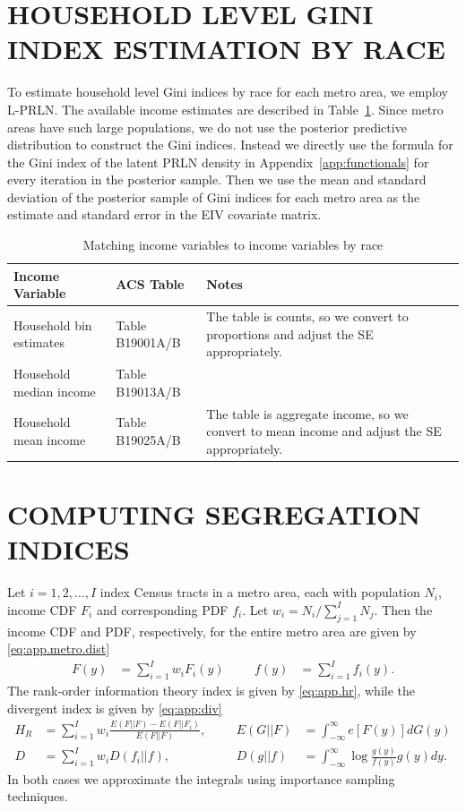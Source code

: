 \documentclass[12pt]{article}
\begin{document}
\section{HOUSEHOLD LEVEL GINI INDEX ESTIMATION BY RACE}\label{app:gini}
\setcounter{table}{0}
To estimate household level Gini indices by race for each metro area, we employ L-PRLN. The available income estimates are described in Table~\ref{tab:race.income.ests}. Since metro areas have such large populations, we do not use the posterior predictive distribution to construct the Gini indices. Instead we directly use the formula for the Gini index of the latent PRLN density in Appendix~\ref{app:functionals} for every iteration in the posterior sample. Then we use the mean and standard deviation of the posterior sample of Gini indices for each metro area as the estimate and standard error in the EIV covariate matrix.

\begin{table}[ht]
  \centering
  \scriptsize{
  \begin{tabular}{|m{9em}|m{4cm}|m{8cm}|}
    \hline
    Income Variable & ACS Table & Notes \\
    \hline
    Household bin estimates & Table B19001A/B & The table is counts, so we convert to proportions and adjust the SE appropriately.\\\hline
    Household median income & Table B19013A/B &  \\\hline
    Household mean income & Table B19025A/B & The table is aggregate income, so we convert to mean income and adjust the SE appropriately. \\\hline
  \end{tabular}
  }
  \caption{Matching income variables to income variables by race}
  \label{tab:race.income.ests}
\end{table}

\clearpage

\section{COMPUTING SEGREGATION INDICES}\label{app:compute.indices}
\setcounter{table}{0}
Let $i=1,2,\dots,I$ index Census tracts in a metro area, each with population $N_i$, income CDF $F_i$ and corresponding PDF $f_i$. Let $w_i = N_i / \sum_{j=1}^IN_j$. Then the income CDF and PDF, respectively, for the entire metro area are given by \eqref{eq:app.metro.dist}
\begin{align}
  F(y) &= \sum_{i=1}^Iw_iF_i(y) &&& f(y) &= \sum_{i=1}^If_i(y). \label{eq:app.metro.dist}
\end{align}
The rank-order information theory index is given by \eqref{eq:app.hr}, while the divergent index is given by \eqref{eq:app:div}
\begin{align}
  H_R &= \sum_{i=1}^Iw_i\frac{E(F||F) - E(F||F_i)}{E(F||F)}, &&& E(G||F) &= \int_{-\infty}^{\infty}e[F(y)]dG(y) \label{eq:app.hr}\\
  D &= \sum_{i=1}^Iw_i D(f_i||f), &&& D(g||f)&= \int_{-\infty}^{\infty}\log \frac{g(y)}{f(y)}g(y)dy. \label{eq:app:div}
\end{align}
In both cases we approximate the integrals using importance sampling techniques.
\end{document}
